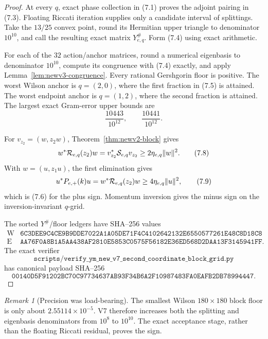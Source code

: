 \documentclass[11pt,oneside]{article}
\theoremstyle{definition}
\theoremstyle{remark}
\newtheorem{remark}[theorem]{Remark}
\begin{document}
\begin{proof}
At every \(q\), exact phase collection in (7.1) proves the adjoint
pairing in (7.3).  Floating Riccati iteration supplies only a
candidate interval of splittings.  Take the \(13/25\) convex point,
round its Hermitian upper triangle to denominator \(10^{10}\), and
call the resulting exact matrix \(Y_{e,q}^\#\).  Form (7.4) using
exact arithmetic.

For each of the \(32\) action/anchor matrices, round a numerical
eigenbasis to denominator \(10^{10}\), compute its congruence with
(7.4) exactly, and apply
Lemma~\ref{lem:newv3-congruence}.  Every rational Gershgorin floor is
positive.  The worst Wilson anchor is \(q=(2,0)\), where the first
fraction in (7.5) is attained.  The worst endpoint anchor is
\(q=(1,2)\), where the second fraction is attained.  The largest
exact Gram-error upper bounds are
\[
 \frac{10443}{10^{12}},\qquad \frac{10441}{10^{12}}.      \tag{7.7}
\]

For \(v_{z_2}=(w,z_2w)\), Theorem~\ref{thm:newv2-block}
gives
\[
 w^*{\cal R}_{e,q}(z_2)w
 =v_{z_2}^*{\cal S}_{e,q}v_{z_2}
 \ge2\eta_{e,q}\|w\|^2.                                  \tag{7.8}
\]
With \(w=(u,z_1u)\), the first elimination gives
\[
 u^*P_{e,+}(k)u
 =w^*{\cal R}_{e,q}(z_2)w
 \ge4\eta_{e,q}\|u\|^2,                                  \tag{7.9}
\]
which is (7.6) for the plus sign.  Momentum inversion gives the
minus sign on the inversion-invariant \(q\)-grid.

The sorted \(Y^\#\)/floor ledgers have SHA--256 values
\[
\begin{array}{c|c}
\mathrm W&
\texttt{6C3DEE9C4CE9B9DDE7022A1A05DE71F4C4102642132E6550577261E48C8D18C8}\\
\mathrm E&
\texttt{AA76F0A8B1A5AA438AF2810E5853C0575F56182E36ED568D2DAA13F3145941FF}.
\end{array}                                               \tag{7.10}
\]
The exact verifier
\[
\texttt{scripts/verify\_ym\_new\_v7\_second\_coordinate\_block\_grid.py}
\]
has canonical payload SHA--256
\[
\texttt{00140D5F91202BC70C97734637AB93F34B6A2F10987483FA0EAFB2DB78994447}.
                                                               \tag{7.11}
\]
\end{proof}

\begin{remark}[Precision was load-bearing]
\label{rem:newv7-precision}
The smallest Wilson \(180\times180\) block floor is only about
\(2.55114\times10^{-5}\).  V7 therefore increases both the splitting
and eigenbasis denominators from \(10^8\) to \(10^{10}\).  The exact
acceptance stage, rather than the floating Riccati residual, proves
the sign.
\end{remark}
\end{document}
